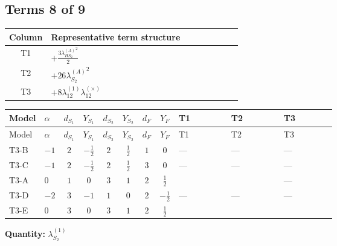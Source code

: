 \documentclass[8pt]{article}
\begin{document}
\begin{landscape}
\subsection*{Terms 8 of 9}
\begin{center}
\begin{tabular}{@{}c >{\raggedright\arraybackslash}p{0.82\linewidth}@{}}
\toprule
Column & Representative term structure \\
\midrule
T1 & \(\displaystyle +\frac{3 {\lambda_{HS_2}^{(A)}}^2}{2}\) \\
\midrule
T2 & \(\displaystyle +26 {\lambda_{S_2}^{(A)}}^2\) \\
\midrule
T3 & \(\displaystyle +8 {\lambda_{12}^{(1)}} {\lambda_{12}^{(\times)}}\) \\
\midrule
\bottomrule
\end{tabular}
\end{center}
\smallskip
\tiny
\begin{longtable}{@{}llcccccc >{\raggedright\arraybackslash}p{0.21\linewidth} >{\raggedright\arraybackslash}p{0.21\linewidth} >{\raggedright\arraybackslash}p{0.21\linewidth}@{}}
\toprule
Model & $\alpha$ & $d_{S_1}$ & $Y_{S_1}$ & $d_{S_2}$ & $Y_{S_2}$ & $d_F$ & $Y_F$ & T1 & T2 & T3 \\
\midrule
\endfirsthead
\toprule
Model & $\alpha$ & $d_{S_1}$ & $Y_{S_1}$ & $d_{S_2}$ & $Y_{S_2}$ & $d_F$ & $Y_F$ & T1 & T2 & T3 \\
\midrule
\endhead
T3-B & $-1$ & $2$ & $-\frac{1}{2}$ & $2$ & $\frac{1}{2}$ & $1$ & $0$ & --- & --- & --- \\
\midrule
T3-C & $-1$ & $2$ & $-\frac{1}{2}$ & $2$ & $\frac{1}{2}$ & $3$ & $0$ & --- & --- & --- \\
\midrule
T3-A & $0$ & $1$ & $0$ & $3$ & $1$ & $2$ & $\frac{1}{2}$ & \scriptsize\adjustbox{max width=\linewidth}{$\begin{gathered} +\frac{3 {\lambda_{HS_2}^{(A)}}^2}{2}\end{gathered}$} & \scriptsize\adjustbox{max width=\linewidth}{$\begin{gathered} +26 {\lambda_{S_2}^{(A)}}^2\end{gathered}$} & --- \\
\midrule
T3-D & $-2$ & $3$ & $-1$ & $1$ & $0$ & $2$ & $-\frac{1}{2}$ & --- & --- & --- \\
\midrule
T3-E & $0$ & $3$ & $0$ & $3$ & $1$ & $2$ & $\frac{1}{2}$ & \scriptsize\adjustbox{max width=\linewidth}{$\begin{gathered} +\frac{3 {\lambda_{HS_2}^{(A)}}^2}{2}\end{gathered}$} & \scriptsize\adjustbox{max width=\linewidth}{$\begin{gathered} +26 {\lambda_{S_2}^{(A)}}^2\end{gathered}$} & \scriptsize\adjustbox{max width=\linewidth}{$\begin{gathered} +8 {\lambda_{12}^{(1)}} {\lambda_{12}^{(\times)}}\end{gathered}$} \\
\midrule
\bottomrule
\end{longtable}
\clearpage
\noindent\textbf{Quantity: }$\lambda_{S_2}^{(1)}$\par\smallskip

\end{landscape}
\end{document}
